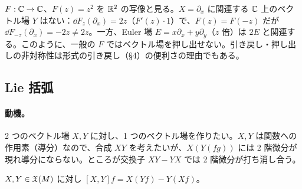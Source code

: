 \begin{ex}[関連付けの失敗]\label{A:ex:notrelated}
$F:\mathbb C\to\mathbb C$、$F(z)=z^2$ を $\mathbb R^2$ の写像と見る。$X=\partial_x$ に関連する $\mathbb C$ 上のベクトル場 $Y$ はない：$\dd F_z(\partial_x)=2z$（$F'(z)\cdot1$）で、$F(z)=F(-z)$ だが $\dd F_{-z}(\partial_x)=-2z\ne2z$。一方、Euler 場 $E=x\partial_x+y\partial_y$（$z$ 倍）は $2E$ と関連する。このように、一般の $F$ ではベクトル場を押し出せない。引き戻し・押し出しの非対称性は形式の引き戻し（§4）の便利さの理由でもある。
\end{ex}

\subsection{Lie 括弧}
\paragraph{動機。}2 つのベクトル場 $X,Y$ に対し、1 つのベクトル場を作りたい。$X,Y$ は関数への作用素（導分）なので、合成 $XY$ を考えたいが、$X(Y(fg))$ には 2 階微分が現れ導分にならない。ところが交換子 $XY-YX$ では 2 階微分が打ち消し合う。

\begin{defn}[Lie 括弧]
$X,Y\in\mathfrak X(M)$ に対し $[X,Y]f=X(Yf)-Y(Xf)$。
\end{defn}

